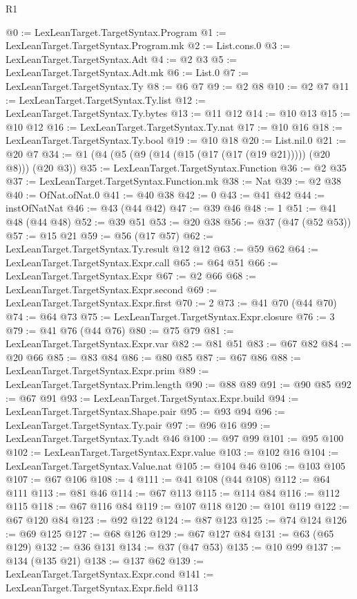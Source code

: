 \begin{lexlean}{R1}
\begin{coremodule}
@0 := LexLeanTarget.TargetSyntax.Program
@1 := LexLeanTarget.TargetSyntax.Program.mk
@2 := List.cons.{0}
@3 := LexLeanTarget.TargetSyntax.Adt
@4 := @2 @3
@5 := LexLeanTarget.TargetSyntax.Adt.mk
@6 := List.{0}
@7 := LexLeanTarget.TargetSyntax.Ty
@8 := @6 @7
@9 := @2 @8
@10 := @2 @7
@11 := LexLeanTarget.TargetSyntax.Ty.list
@12 := LexLeanTarget.TargetSyntax.Ty.bytes
@13 := @11 @12
@14 := @10 @13
@15 := @10 @12
@16 := LexLeanTarget.TargetSyntax.Ty.nat
@17 := @10 @16
@18 := LexLeanTarget.TargetSyntax.Ty.bool
@19 := @10 @18
@20 := List.nil.{0}
@21 := @20 @7
@34 := @1 (@4 (@5 (@9 (@14 (@15 (@17 (@17 (@19 @21))))) (@20 @8))) (@20 @3))
@35 := LexLeanTarget.TargetSyntax.Function
@36 := @2 @35
@37 := LexLeanTarget.TargetSyntax.Function.mk
@38 := Nat
@39 := @2 @38
@40 := OfNat.ofNat.{0}
@41 := @40 @38
@42 := 0
@43 := @41 @42
@44 := instOfNatNat
@46 := @43 (@44 @42)
@47 := @39 @46
@48 := 1
@51 := @41 @48 (@44 @48)
@52 := @39 @51
@53 := @20 @38
@56 := @37 (@47 (@52 @53))
@57 := @15 @21
@59 := @56 (@17 @57)
@62 := LexLeanTarget.TargetSyntax.Ty.result @12 @12
@63 := @59 @62
@64 := LexLeanTarget.TargetSyntax.Expr.call
@65 := @64 @51
@66 := LexLeanTarget.TargetSyntax.Expr
@67 := @2 @66
@68 := LexLeanTarget.TargetSyntax.Expr.second
@69 := LexLeanTarget.TargetSyntax.Expr.first
@70 := 2
@73 := @41 @70 (@44 @70)
@74 := @64 @73
@75 := LexLeanTarget.TargetSyntax.Expr.closure
@76 := 3
@79 := @41 @76 (@44 @76)
@80 := @75 @79
@81 := LexLeanTarget.TargetSyntax.Expr.var
@82 := @81 @51
@83 := @67 @82
@84 := @20 @66
@85 := @83 @84
@86 := @80 @85
@87 := @67 @86
@88 := LexLeanTarget.TargetSyntax.Expr.prim
@89 := LexLeanTarget.TargetSyntax.Prim.length
@90 := @88 @89
@91 := @90 @85
@92 := @67 @91
@93 := LexLeanTarget.TargetSyntax.Expr.build
@94 := LexLeanTarget.TargetSyntax.Shape.pair
@95 := @93 @94
@96 := LexLeanTarget.TargetSyntax.Ty.pair
@97 := @96 @16
@99 := LexLeanTarget.TargetSyntax.Ty.adt @46
@100 := @97 @99
@101 := @95 @100
@102 := LexLeanTarget.TargetSyntax.Expr.value
@103 := @102 @16
@104 := LexLeanTarget.TargetSyntax.Value.nat
@105 := @104 @46
@106 := @103 @105
@107 := @67 @106
@108 := 4
@111 := @41 @108 (@44 @108)
@112 := @64 @111
@113 := @81 @46
@114 := @67 @113
@115 := @114 @84
@116 := @112 @115
@118 := @67 @116 @84
@119 := @107 @118
@120 := @101 @119
@122 := @67 @120 @84
@123 := @92 @122
@124 := @87 @123
@125 := @74 @124
@126 := @69 @125
@127 := @68 @126
@129 := @67 @127 @84
@131 := @63 (@65 @129)
@132 := @36 @131
@134 := @37 (@47 @53)
@135 := @10 @99
@137 := @134 (@135 @21)
@138 := @137 @62
@139 := LexLeanTarget.TargetSyntax.Expr.cond
@141 := LexLeanTarget.TargetSyntax.Expr.field @113

\end{coremodule}
\end{lexlean}
